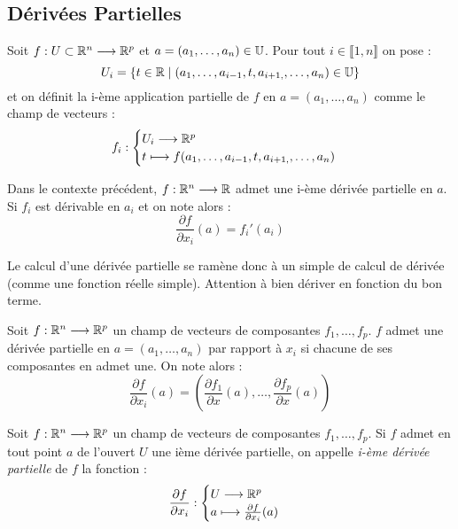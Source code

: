 \subsection{Dérivées Partielles}

\begin{definition}
    Soit $f : U \subset \mathbb{R}^n \longrightarrow \mathbb{R}^p$ et $a = (a_1, \dots, a_n) \in \mathbb{U}$. 
    Pour tout $ i \in \llbracket 1, n \rrbracket$ on pose : 
        \[ U_i = \{t \in \mathbb{R} \; | \; (a_1, \dots, a_{i-1}, t, a_{i+1,}, \dots, a_n) \in \mathbb{U}\} \] 
    et on définit la i-ème application partielle de $f$ en $a = (a_1, \dots, a_n)$ comme le champ de vecteurs : 
        \[ f_i : 
            \begin{cases}
                U_i \longrightarrow \mathbb{R}^p \\ 
                t \longmapsto f(a_1, \dots, a_{i-1}, t, a_{i+1,}, \dots, a_n)
            \end{cases} \] 
\end{definition}

\begin{definition}
    Dans le contexte précédent, $f : \mathbb{R}^n \longrightarrow \mathbb{R}$ admet une i-ème dérivée partielle en $a$. 
    Si $f_i$ est dérivable en $a_i$ et on note alors : 
        \[ \frac{\partial f}{\partial x_i} (a) = f_i'(a_i) \] 
\end{definition}

Le calcul d'une dérivée partielle se ramène donc à un simple de calcul de dérivée (comme une fonction réelle simple). 
Attention à bien dériver en fonction du bon terme. 

\begin{proposition}
    Soit $f : \mathbb{R}^n \longrightarrow \mathbb{R}^p$ un champ de vecteurs de composantes $f_1, \dots, f_p$. 
    $f$ admet une dérivée partielle en $a = (a_1, \dots, a_n)$ par rapport à $x_i$ si chacune de 
    ses composantes en admet une. 
    On note alors : 
        \[ \frac{\partial f}{\partial x_i}(a) = \left(\frac{\partial f_1}{\partial x}(a), \dots, \frac{\partial f_p}{\partial x}(a)\right) \] 
\end{proposition}

\begin{definition}
    Soit $f : \mathbb{R}^n \longrightarrow \mathbb{R}^p$ un champ de vecteurs de composantes $f_1, \dots, f_p$.
    Si $f$ admet en tout point $a$ de l'ouvert $U$ une ième dérivée partielle, on appelle \emph{i-ème dérivée partielle}
    de $f$ la fonction : 
        \[ \frac{\partial f}{\partial x_i} : 
            \begin{cases}
                U \longrightarrow \mathbb{R}^p \\ 
                a \longmapsto \frac{\partial f}{\partial x_i} (a) 
            \end{cases} \] 
\end{definition}


